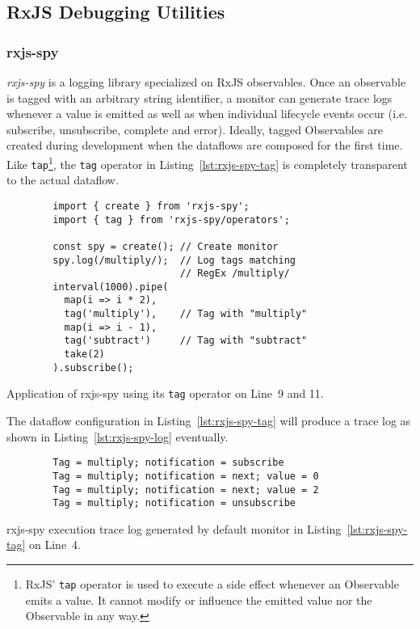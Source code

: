 \documentclass[sigplan,screen,review]{acmart}
\begin{document}
\subsection{RxJS Debugging Utilities}
\label{sec:rxjs-debugging-utilities}

\subsubsection{rxjs-spy}

\emph{rxjs-spy}\cite{rxjsspy} is a logging library specialized on RxJS observables. Once an observable is tagged with an arbitrary string identifier, a monitor can generate trace logs whenever a value is emitted as well as when individual lifecycle events occur (i.e. subscribe, unsubscribe, complete and error). Ideally, tagged Observables are created during development when the dataflows are composed for the first time. Like \texttt{tap}\footnote{RxJS' \texttt{tap} operator is used to execute a side effect whenever an Observable emits a value. It cannot modify or influence the emitted value nor the Observable in any way.}, the \texttt{tag} operator in Listing~\ref{lst:rxjs-spy-tag} is completely transparent to the actual dataflow.

\begin{listing}
	\begin{verbatim}
		import { create } from 'rxjs-spy';
		import { tag } from 'rxjs-spy/operators';

		const spy = create(); // Create monitor
		spy.log(/multiply/);  // Log tags matching
		                      // RegEx /multiply/
		interval(1000).pipe(
		  map(i => i * 2),
		  tag('multiply'),    // Tag with "multiply"
		  map(i => i - 1),
		  tag('subtract')     // Tag with "subtract"
		  take(2)
		).subscribe();
	\end{verbatim}
	\caption{Application of rxjs-spy using its \texttt{tag} operator on Line~9 and 11.}
	\label{lst:rxjs-spy-tag}
\end{listing}

The dataflow configuration in Listing~\ref{lst:rxjs-spy-tag} will produce a trace log as shown in Listing~\ref{lst:rxjs-spy-log} eventually.

\begin{listing}
	\begin{verbatim}
		Tag = multiply; notification = subscribe
		Tag = multiply; notification = next; value = 0
		Tag = multiply; notification = next; value = 2
		Tag = multiply; notification = unsubscribe
	\end{verbatim}
	\caption{rxjs-spy execution trace log generated by default monitor in Listing~\ref{lst:rxjs-spy-tag} on Line~4.}
	\label{lst:rxjs-spy-log}
\end{listing}
\end{document}
